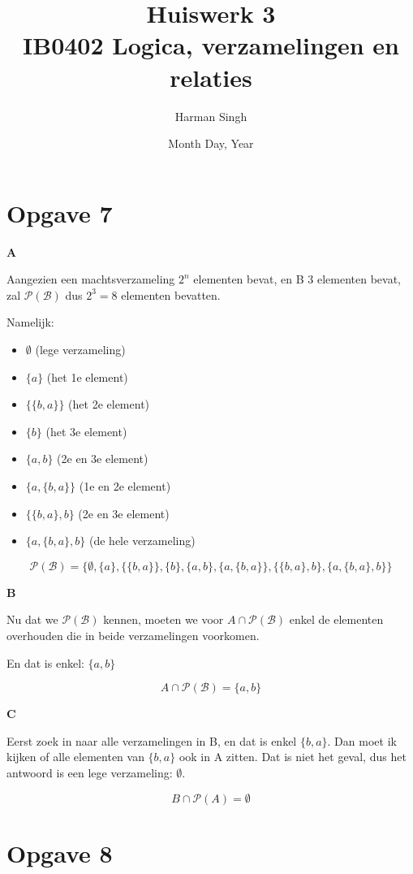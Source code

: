 \documentclass[11pt, a4paper]{article}
\title{Huiswerk 3 \\ IB0402 Logica, verzamelingen en relaties}
\author{Harman Singh}
\date{Month Day, Year}
\begin{document}
\maketitle

\pagebreak
\section*{Opgave 7}

\textbf{A}

Aangezien een machtsverzameling $2^n$ elementen bevat, en B 3 elementen bevat, zal $\mathcal{P(B)}$ dus $2^3 = 8$ elementen bevatten.

Namelijk:

\begin{itemize}
	\item $\emptyset$ \hfill(lege verzameling)
	\item $\{a\}$ \hfill(het 1e element)
	\item $\{\{b,a\}\}$ \hfill(het 2e element)
	\item $\{b\}$ \hfill(het 3e element)
	\item $\{a,b\}$ \hfill(2e en 3e element)
	\item $\{a,\{b,a\}\}$ \hfill(1e en 2e element)
	\item $\{\{b,a\},b\}$ \hfill(2e en 3e element)
	\item $\{a, \{b,a\},b\}$ \hfill(de hele verzameling)
\end{itemize}

\[
\boxed{\mathcal{P(B)} = \{\emptyset, \{a\}, \{\{b,a\}\}, \{b\}, \{a,b\}, \{a,\{b,a\}\}, \{\{b,a\},b\}, \{a, \{b,a\},b\}\}}
\]


\textbf{B}

Nu dat we $\mathcal{P(B)}$ kennen, moeten we voor $A \cap \mathcal{P(B)}$ enkel de elementen overhouden die in beide verzamelingen voorkomen.

En dat is enkel: $\{a,b\}$

\[\boxed{A \cap \mathcal{P(B)} = \{a,b\}}\]

\textbf{C}

Eerst zoek in naar alle verzamelingen in B, en dat is enkel $\{b,a\}$. Dan moet ik kijken of alle elementen van $\{b,a\}$ ook in A zitten. Dat is niet het geval, dus het antwoord is een lege verzameling: $\emptyset$.

\[\boxed{B \cap \mathcal{P}(A) = \emptyset} \]



\pagebreak
\section*{Opgave 8}
\end{document}
